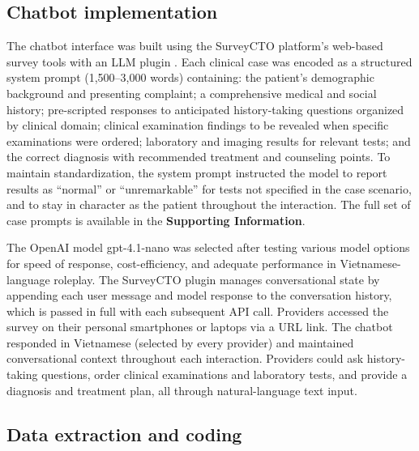 \documentclass{article}
\begin{document}
\subsection{Chatbot implementation}

The chatbot interface was built using the SurveyCTO platform's web-based survey tools with an LLM plugin \citep{geiecke2024conversations, surveycto2025llm}. Each clinical case was encoded as a structured system prompt (1,500--3,000 words) containing: the patient's demographic background and presenting complaint; a comprehensive medical and social history; pre-scripted responses to anticipated history-taking questions organized by clinical domain; clinical examination findings to be revealed when specific examinations were ordered; laboratory and imaging results for relevant tests; and the correct diagnosis with recommended treatment and counseling points. To maintain standardization, the system prompt instructed the model to report results as ``normal'' or ``unremarkable'' for tests not specified in the case scenario, and to stay in character as the patient throughout the interaction. The full set of case prompts is available in the \textbf{Supporting Information}.

The OpenAI model gpt-4.1-nano was selected after testing various model options for speed of response, cost-efficiency, and adequate performance in Vietnamese-language roleplay. The SurveyCTO plugin manages conversational state by appending each user message and model response to the conversation history, which is passed in full with each subsequent API call. Providers accessed the survey on their personal smartphones or laptops via a URL link. The chatbot responded in Vietnamese (selected by every provider) and maintained conversational context throughout each interaction. Providers could ask history-taking questions, order clinical examinations and laboratory tests, and provide a diagnosis and treatment plan, all through natural-language text input.

\subsection{Data extraction and coding}
\end{document}
